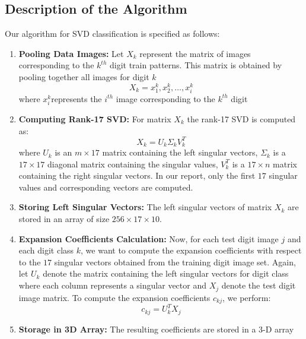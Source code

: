 \documentclass{article} %
\begin{document}
    \subsection{Description of the Algorithm}
        \label{SECT: SECTION 4.1}
            Our algorithm for SVD classification is specified as follows:
            \begin{enumerate}
                \item \textbf{Pooling Data Images:} Let $X_k$ represent the matrix of images corresponding to the $k^{th}$ digit train patterns. This matrix is obtained by pooling together all images for digit $k$
                \begin{equation*}
                    X_k = {x_1^k, x_2^k, \hdots, x_i^k}
                \end{equation*}
                where $x_i^k$represents the $i^{th}$ image corresponding to the $k^{th}$ digit
                \item \textbf{Computing Rank-17 SVD:} For matrix $X_k$ the rank-17 SVD is computed as:
                \begin{equation*}
                    X_k = U_k \Sigma_k V_k^T
                \end{equation*} where $U_k$ is an $m \times 17$ matrix containing the left singular vectors, $\Sigma_k$ is a $17 \times 17$ diagonal matrix containing the singular values, $V_k^T$ is a $17 \times n$ matrix containing the right singular vectors.
                In our report, only the first $17$ singular values and corresponding vectors are computed.
                \item \textbf{Storing Left Singular Vectors:} The left singular vectors of matrix $X_k$ are stored in an array of size $256 \times 17 \times 10$. 
                \item \textbf{Expansion Coefficients Calculation:} Now, for each test digit image $j$ and each digit class $k$, we want to compute the expansion coefficients with respect to the $17$ singular vectors obtained from the training digit image set. Again, let $U_k$ denote the matrix containing the left singular vectors for digit class where each column represents a singular vector and $X_j$ denote the test digit image matrix. To compute the expansion coefficients $c_{kj}$, we perform:
                \begin{equation*}
                    c_{kj} = U_k^T X_j
                \end{equation*}
                \item \textbf{Storage in 3D Array:} The resulting coefficients are stored in a 3-D array
            \end{enumerate}
\end{document}
